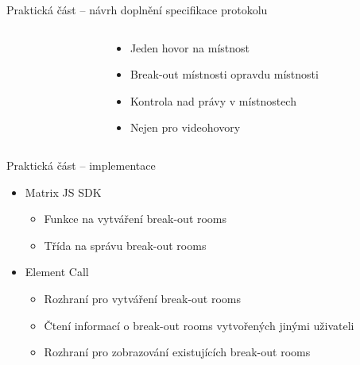 \documentclass[aspectratio=169]{beamer}
\begin{document}
\begin{frame}{Praktická část -- návrh doplnění specifikace protokolu}
    \pause
    \begin{columns}[T]
        \begin{column}{0.5\textwidth}
        \end{column}
        \begin{column}{0.5\textwidth}
            \begin{itemize}[<+->]
                \item Jeden hovor na místnost
                \item Break-out místnosti opravdu místnosti
                \item Kontrola nad právy v místnostech
                \item Nejen pro videohovory
            \end{itemize}
        \end{column}
    \end{columns}
\end{frame}
\begin{frame}{Praktická část -- implementace}
    \pause
    \begin{itemize}[<+->]
        \item Matrix JS SDK
              \begin{itemize}
                  \item Funkce na vytváření break-out rooms
                  \item Třída na správu break-out rooms
              \end{itemize}
        \item Element Call
              \begin{itemize}
                  \item Rozhraní pro vytváření break-out rooms
                  \item Čtení informací o break-out rooms vytvořených jinými uživateli
                  \item Rozhraní pro zobrazování existujících break-out rooms
              \end{itemize}
    \end{itemize}
\end{frame}
\end{document}
